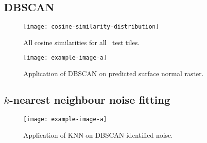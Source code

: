 \subsection{DBSCAN}

\begin{figure}[H]
  \centering
  \texttt{[image: cosine-similarity-distribution]}
  \caption{All cosine similarities for all \numtesttiles~test tiles.}
\end{figure}

\begin{figure}[H]
  \centering
  \texttt{[image: example-image-a]}
  \caption{Application of DBSCAN on predicted surface normal raster.}
\end{figure}

\subsection{\texorpdfstring{$k$}{k}-nearest neighbour noise fitting}

\begin{figure}[H]
  \centering
  \texttt{[image: example-image-a]}
  \caption{Application of KNN on DBSCAN-identified noise.}
\end{figure}

